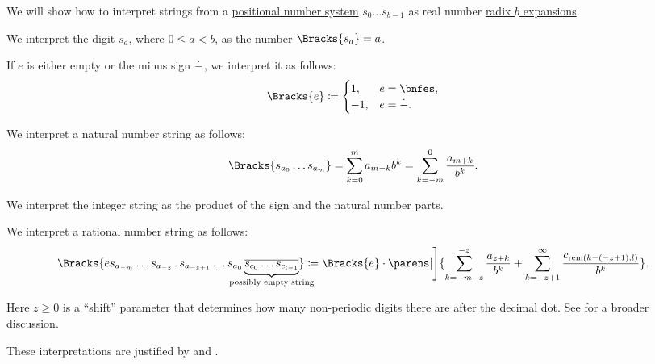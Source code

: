 \begin{definition}\label{def:positional_notation_as_radix_expansion}\mimprovised
  We will show how to interpret strings from a \hyperref[def:positional_number_system]{positional number system} \( s_0 \ldots s_{b-1} \) as real number \hyperref[def:real_number_radix_expansion]{radix \( b \) expansions}.

  \begin{thmenum}
     We interpret the digit \( s_a \), where \( 0 \leq a < b \), as the number \( \Bracks{s_a} = a \).

     If \( e \) is either empty or the minus sign \( \dot{-} \), we interpret it as follows:
    \begin{equation*}
      \Bracks{e} \coloneqq \begin{cases}
        1,  &e = \bnfes, \\
        -1, &e = \syn-.
      \end{cases}
    \end{equation*}

     We interpret a natural number string as follows:
    \begin{equation*}
      \Bracks{s_{a_0} \ldots s_{a_m}} = \sum_{k=0}^m a_{m-k} b^k = \sum_{k=-m}^0 \frac {a_{m+k}} {b^k}.
    \end{equation*}

     We interpret the integer string as the product of the sign and the natural number parts.

     We interpret a rational number string as follows:
    \begin{equation*}
      \Bracks{e s_{a_{-m}} \ldots s_{a_{-z}} \thinspace . \thinspace s_{a_{-z+1}} \ldots s_{a_0} \underbrace{\oline{s_{c_0} \ldots s_{c_{l-1}}}}_{\mathclap{\T{possibly empty string}}}} \coloneqq \Bracks{e} \cdot \parens[\Bigg]{ \sum_{k=-m-z}^{-z} \frac {a_{z+k}} {b^k} + \sum_{k=-z + 1}^\infty \frac {c_{\rem(k - (-z + 1), l)}} {b^k} }.
    \end{equation*}

    Here \( z \geq 0 \) is a \enquote{shift} parameter that determines how many non-periodic digits there are after the decimal dot. See  for a broader discussion.
  \end{thmenum}
\end{definition}
\begin{comments}
  \item These interpretations are justified by  and .
\end{comments}

